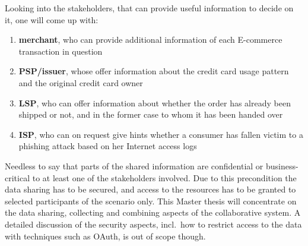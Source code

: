 Looking into the stakeholders, that can provide useful information to decide on it, one will come up with:\@

\begin{enumerate}
    \item \textbf{merchant}, who can provide additional information of each E-commerce transaction in question
    \item \textbf{\gls{PSP}/issuer}, whose offer information about the credit card usage pattern and the original credit card owner
    \item \textbf{\gls{LSP}}, who can offer information about whether the order has already been shipped or not, and in the former case to whom it has been handed over
    \item \textbf{\gls{ISP}}, who can on request give hints whether a consumer has fallen victim to a phishing attack based on her Internet access logs
\end{enumerate}

Needless to say that parts of the shared information are confidential or business-critical to at least one of the stakeholders involved. Due to this precondition the data sharing has to be secured, and access to the resources has to be granted to selected participants of the scenario only. This Master thesis will concentrate on the data sharing, collecting and combining aspects of the collaborative system. A detailed discussion of the security aspects, incl.\ how to restrict access to the data with techniques such as OAuth, is out of scope though. 

